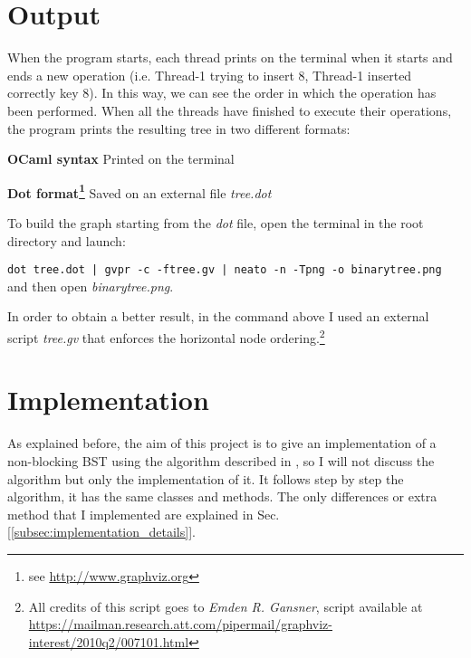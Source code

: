 \documentclass[a4paper]{article}
\begin{document}

\section{Output}
\label{sec:output}
When the program starts, each thread prints on the terminal when it starts and ends a new operation (i.e. Thread-1 trying to insert 8, Thread-1 inserted correctly key 8). In this way, we can see the order in which the operation has been performed.
When all the threads have finished to execute their operations, the program prints the resulting tree in two different formats:
\begin{compactitem}
  \item \textbf{OCaml syntax} Printed on the terminal
  \item \textbf{Dot format\footnote{see \url{http://www.graphviz.org}}} Saved on an external file \emph{tree.dot}
\end{compactitem}

\noindent
To build the graph starting from the \emph{dot} file, open the terminal in the root directory and launch:

\verb!dot tree.dot | gvpr -c -ftree.gv | neato -n -Tpng -o binarytree.png!
\\
\noindent
and then open \emph{binarytree.png}. 

In order to obtain a better result, in the command above I used an external script \emph{tree.gv} that enforces the horizontal node ordering.\footnote{All credits of this script goes to \emph{Emden R. Gansner}, script available at \url{https://mailman.research.att.com/pipermail/graphviz-interest/2010q2/007101.html}}


\section{Implementation} %
\label{sec:implementation}
As explained before, the aim of this project is to give an implementation of a non-blocking \ac{BST} using the algorithm described in \cite{algorithm}, so I will not discuss the algorithm but only the implementation of it.
It follows step by step the algorithm, it has the same classes and methods. The only differences or extra method that I implemented are explained in Sec.[\ref{subsec:implementation_details}].
\end{document}
